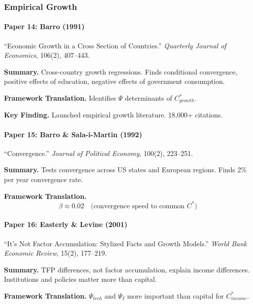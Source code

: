 \subsubsection{Empirical Growth}

\paragraph{Paper 14: Barro (1991)}

``Economic Growth in a Cross Section of Countries.''
\textit{Quarterly Journal of Economics}, 106(2), 407--443.

\textbf{Summary.}
Cross-country growth regressions. Finds conditional convergence, positive 
effects of education, negative effects of government consumption.

\textbf{Framework Translation.}
Identifies $\Psi$ determinants of $C^*_{growth}$.

\textbf{Key Finding.}
Launched empirical growth literature. 18,000+ citations.

\paragraph{Paper 15: Barro \& Sala-i-Martin (1992)}

``Convergence.''
\textit{Journal of Political Economy}, 100(2), 223--251.

\textbf{Summary.}
Tests convergence across US states and European regions. Finds 2\% per year 
convergence rate.

\textbf{Framework Translation.}
\begin{equation}
\beta \approx 0.02 \quad \text{(convergence speed to common } C^*\text{)}
\end{equation}

\paragraph{Paper 16: Easterly \& Levine (2001)}

``It's Not Factor Accumulation: Stylized Facts and Growth Models.''
\textit{World Bank Economic Review}, 15(2), 177--219.

\textbf{Summary.}
TFP differences, not factor accumulation, explain income differences. 
Institutions and policies matter more than capital.

\textbf{Framework Translation.}
$\Psi_{tech}$ and $\Psi_I$ more important than capital for $C^*_{income}$.

